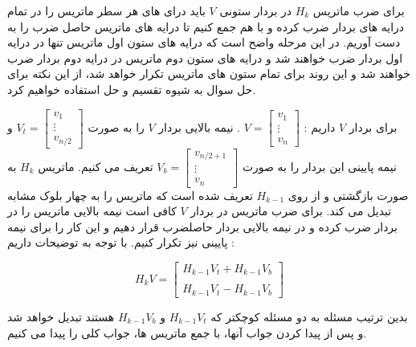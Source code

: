 \documentclass[]{article}
\begin{document}
برای ضرب ماتریس $H_k$
در بردار ستونی $V$
باید درای های هر سطر ماتریس را در تمام درایه های بردار ضرب کرده و با هم جمع کنیم تا
درایه های ماتریس حاصل ضرب را به دست آوریم.
در این مرحله واضح است که درایه های ستون اول ماتریس تنها در درایه اول بردار ضرب خواهند شد و 
درایه های ستون دوم ماتریس در درایه دوم بردار ضرب خواهند شد و این روند برای تمام ستون های ماتریس تکرار خواهد شد،
از این نکته برای حل سوال به شیوه تقسیم و حل استفاده خواهیم کرد.

برای بردار $V$ داریم :
$
V = 
\left[
\begin{matrix}
    v_1 \\
    \vdots \\
    v_n
\end{matrix}  
\right]
$
.
نیمه بالایی بردار $V$ را به صورت
$
V_t =
\left[
\begin{matrix}
    v_1 \\
    \vdots \\
    v_{n/2}
\end{matrix}  
\right]
$
و نیمه پایینی این بردار را به صورت
$
V_b =
\left[
    \begin{matrix}
        \displaystyle v_{n/2 + 1} \\
        \vdots \\
        v_{n}
    \end{matrix}  
    \right]
$
تعریف می کنیم.
ماتریس $H_k$ به صورت بازگشتی و از روی $H_{k-1}$
تعریف شده است که ماتریس را به چهار بلوک مشابه تبدیل می کند.
برای ضرب ماتریس در بردار $V$
کافی است نیمه بالایی ماتریس را در بردار ضرب کرده و در نیمه بالایی بردار حاصلضرب قرار دهیم و این کار را
برای نیمه پایینی نیز تکرار کنیم. با توجه به توضیحات داریم :

$$ H_k V = 
\left[
\begin{matrix}
    H_{k-1}V_t + H_{k-1}V_b \\ \\
    H_{k-1}V_t - H_{k-1}V_b
\end{matrix}  
\right]
$$

بدین ترتیب مسئله به دو مسئله کوچکتر که $H_{k-1}V_t$ و $H_{k-1}V_b$
هستند تبدیل خواهد شد و پس از پیدا کردن جواب آنها، با جمع ماتریس ها، جواب کلی را پیدا می کنیم.
\end{document}
